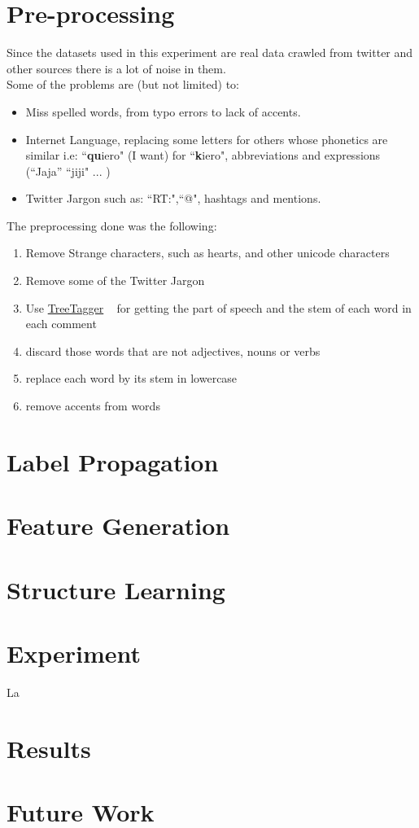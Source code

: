 \documentclass[4pt,a4paper,twocolumn]{article}
\begin{document}
\part*{Pre-processing}

Since the datasets used in this experiment are real data crawled from twitter and other sources there is a lot of noise in them.\\
Some of the problems are (but not limited) to:\\
\begin{itemize}
	\item Miss spelled words, from typo errors to lack of accents.
	\item Internet Language, replacing some letters for others whose phonetics are similar i.e: ``\textbf{qu}iero" (I want) for ``\textbf{k}iero", abbreviations and expressions (``Jaja'' ``jiji" ... )
	\item Twitter Jargon such as: ``RT:",``@", hashtags and mentions. 
\end{itemize} 

The preprocessing done was the following:
\begin{enumerate}
	\item Remove Strange characters, such as hearts, and other unicode characters
	\item Remove some of the Twitter Jargon 
	\item Use \href{http://www.ims.uni-stuttgart.de/projekte/corplex/TreeTagger/}{TreeTagger} ~\cite{Schmid94probabilisticpart-of-speech} for getting the part of speech and the stem of each word in each comment
	\item discard those words that are not adjectives, nouns or verbs
	\item replace each word by its stem in lowercase
	\item remove accents from words
\end{enumerate}

\part*{Label Propagation}


\part*{Feature Generation}
\part*{Structure Learning}

\part*{Experiment}


La

\part*{Results}

\part*{Future Work}

{}

\end{document}
